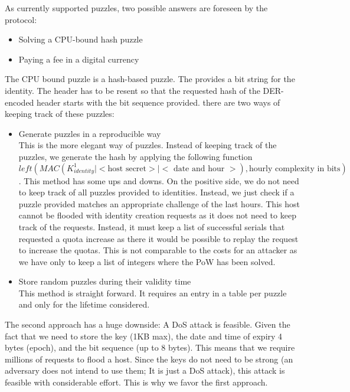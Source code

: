 As currently supported puzzles, two possible answers are foreseen by the protocol:
\begin{itemize}
	\item Solving a CPU-bound hash puzzle 
	\item Paying a fee in a digital currency
\end{itemize}

The CPU bound puzzle is a hash-based puzzle. The \VortexNode{} provides a bit string for the identity. The header has to be resent so that the requested hash of the DER-encoded header starts with the bit sequence provided. there are two ways of keeping track of these puzzles:

\begin{itemize}
	\item Generate puzzles in a reproducible way\\
	This is the more elegant way of puzzles. Instead of keeping track of the puzzles, we generate the hash by applying the following function $left(MAC(K^1_{identity} | <\text{host secret}> | <\text{ date and hour }>),\text{hourly complexity in bits})$. This method has some ups and downs. On the positive side, we do not need to keep track of all puzzles provided to identities. Instead, we just check if a puzzle provided matches an appropriate challenge of the last hours. This host cannot be flooded with identity creation requests as it does not need to keep track of the requests. Instead, it must keep a list of successful serials that requested a quota increase as there it would be possible to replay the request to increase the quotas. This is not comparable to the costs for an attacker as we have only to keep a list of integers where the PoW has been solved.
	\item Store random puzzles during their validity time\\
	This method is straight forward. It requires an entry in a table per puzzle and only for the lifetime considered. 
\end{itemize}

The second approach has a huge downside: A DoS attack is feasible. Given the fact that we need to store the key (1KB max), the date and time of expiry 4 bytes (epoch), and the bit sequence (up to 8 bytes). This means that we require millions of requests to flood a host. Since the keys do not need to be strong (an adversary does not intend to use them; It is just a DoS attack), this attack is feasible with considerable effort. This is why we favor the first approach.

